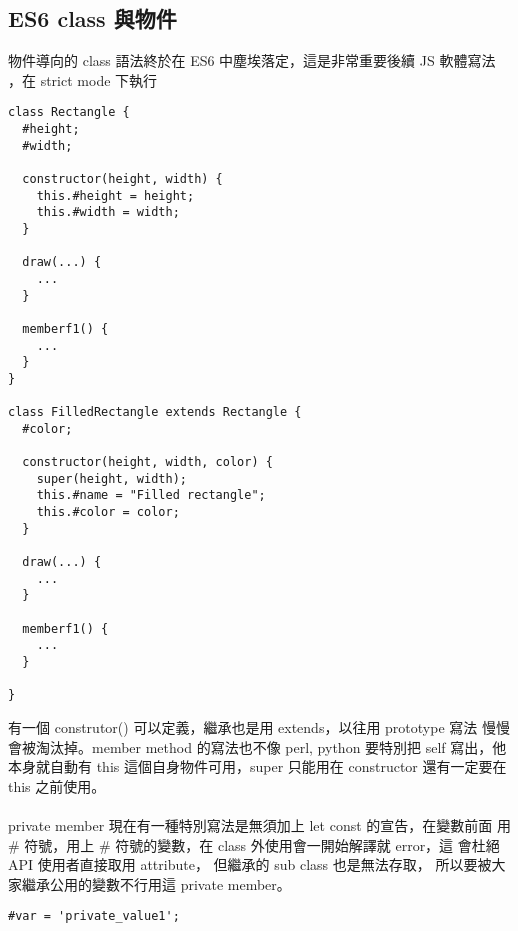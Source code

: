   \subsection{ES6 class 與物件}
  物件導向的 class 語法終於在 ES6 中塵埃落定，這是非常重要後續 JS 軟體寫法
  ，在 strict mode 下執行
  \begin{verbatim}
class Rectangle {
  #height;
  #width;

  constructor(height, width) {
    this.#height = height;
    this.#width = width;
  }

  draw(...) {
    ...
  }

  memberf1() {
    ...
  }
}

class FilledRectangle extends Rectangle {
  #color;

  constructor(height, width, color) {
    super(height, width);
    this.#name = "Filled rectangle";
    this.#color = color;
  }

  draw(...) {
    ...
  }

  memberf1() {
    ...
  }

}
  \end{verbatim}
  有一個 construtor() 可以定義，繼承也是用 extends，以往用 prototype 寫法
  慢慢會被淘汰掉。member method 的寫法也不像 perl, python 要特別把 self
  寫出，他本身就自動有 this 這個自身物件可用，super 只能用在 constructor
  還有一定要在 this 之前使用。
  \\\\
  private member 現在有一種特別寫法是無須加上 let const 的宣告，在變數前面
  用 \# 符號，用上 \# 符號的變數，在 class 外使用會一開始解譯就 error，這
  會杜絕 API 使用者直接取用 attribute， 但繼承的 sub class 也是無法存取，
  所以要被大家繼承公用的變數不行用這 private member。
  \begin{verbatim}
#var = 'private_value1';
  \end{verbatim}
